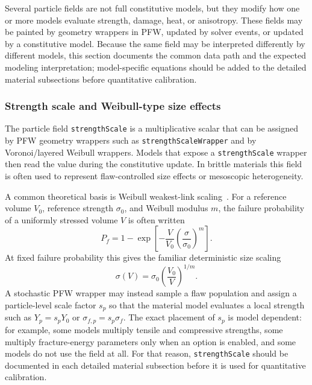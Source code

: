 Several particle fields are not full constitutive models, but they modify how one or more models evaluate strength, damage, heat, or anisotropy.  These fields may be painted by geometry wrappers in PFW, updated by solver events, or updated by a constitutive model.  Because the same field may be interpreted differently by different models, this section documents the common data path and the expected modeling interpretation; model-specific equations should be added to the detailed material subsections before quantitative calibration.

\subsubsection{Strength scale and Weibull-type size effects}
\label{subsubsec:strength-scale-weibull}

The particle field \texttt{strengthScale} is a multiplicative scalar that can be assigned by PFW geometry wrappers such as \texttt{strengthScaleWrapper} and by Voronoi/layered Weibull wrappers.  Models that expose a \texttt{strengthScale} wrapper then read the value during the constitutive update.  In brittle materials this field is often used to represent flaw-controlled size effects or mesoscopic heterogeneity.

A common theoretical basis is Weibull weakest-link scaling~\cite{weibull1951}.  For a reference volume \(V_0\), reference strength \(\sigma_0\), and Weibull modulus \(m\), the failure probability of a uniformly stressed volume \(V\) is often written
\begin{equation}
  P_f = 1 - \exp\left[-\frac{V}{V_0}\left(\frac{\sigma}{\sigma_0}\right)^m\right].
  \label{eq:weibull-failure-probability}
\end{equation}
At fixed failure probability this gives the familiar deterministic size scaling
\begin{equation}
  \sigma(V) = \sigma_0\left(\frac{V_0}{V}\right)^{1/m}.
  \label{eq:weibull-size-scaling}
\end{equation}
A stochastic PFW wrapper may instead sample a flaw population and assign a particle-level scale factor \(s_p\) so that the material model evaluates a local strength such as \(Y_p=s_pY_0\) or \(\sigma_{f,p}=s_p\sigma_f\).  The exact placement of \(s_p\) is model dependent: for example, some models multiply tensile and compressive strengths, some multiply fracture-energy parameters only when an option is enabled, and some models do not use the field at all.  For that reason, \texttt{strengthScale} should be documented in each detailed material subsection before it is used for quantitative calibration.

